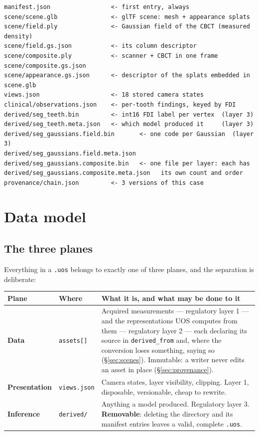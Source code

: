 \documentclass[11pt,a4paper]{article}
\newcommand{\code}[1]{\texttt{\small #1}}
\begin{document}
\begin{lstlisting}[style=plain, caption={Directory layout of the example container}]
manifest.json                 <- first entry, always
scene/scene.glb               <- glTF scene: mesh + appearance splats
scene/field.ply               <- Gaussian field of the CBCT (measured density)
scene/field.gs.json           <- its column descriptor
scene/composite.ply           <- scanner + CBCT in one frame
scene/composite.gs.json
scene/appearance.gs.json      <- descriptor of the splats embedded in scene.glb
views.json                    <- 18 stored camera states
clinical/observations.json    <- per-tooth findings, keyed by FDI
derived/seg_teeth.bin         <- int16 FDI label per vertex  (layer 3)
derived/seg_teeth.meta.json   <- which model produced it     (layer 3)
derived/seg_gaussians.field.bin       <- one code per Gaussian  (layer 3)
derived/seg_gaussians.field.meta.json
derived/seg_gaussians.composite.bin   <- one file per layer: each has
derived/seg_gaussians.composite.meta.json   its own count and order
provenance/chain.json         <- 3 versions of this case
\end{lstlisting}

\section{Data model}\label{sec:model}

\subsection{The three planes}\label{sec:planes}

Everything in a \code{.uos} belongs to exactly one of three planes, and the separation is
deliberate:

\begin{longtable}{L{2.4cm} L{3.2cm} L{9.6cm}}
\toprule
\textbf{Plane} & \textbf{Where} & \textbf{What it is, and what may be done to it}\\
\midrule
\endhead
\textbf{Data} & \code{assets[]} & Acquired measurements --- regulatory layer 1 --- and
the representations UOS computes from them --- regulatory layer 2 --- each declaring its
source in \code{derived\_from} and, where the conversion loses something, saying so
(\S\ref{sec:scenes}). Immutable: a writer never edits an asset in place
(\S\ref{sec:provenance}).\\
\textbf{Presentation} & \code{views.json} & Camera states, layer visibility, clipping.
Layer 1, disposable, versionable, cheap to rewrite.\\
\textbf{Inference} & \code{derived/} & Anything a model produced. Regulatory layer 3.
\textbf{Removable}: deleting the directory and its manifest entries leaves a valid,
complete \code{.uos}.\\
\bottomrule
\end{longtable}
\end{document}
